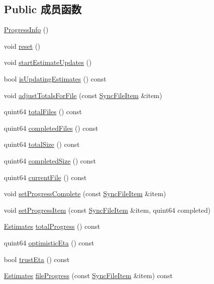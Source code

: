 \subsection*{Public 成员函数}
\begin{DoxyCompactItemize}
\item 
\hyperlink{class_o_c_c_1_1_progress_info_a3621453d1da2ab09c89d89608e95ba5b}{Progress\+Info} ()
\item 
void \hyperlink{class_o_c_c_1_1_progress_info_aeced3c151e007e246f8fd5b75d7e7e82}{reset} ()
\item 
void \hyperlink{class_o_c_c_1_1_progress_info_a07894c5202d9f21cb23ce308900c8415}{start\+Estimate\+Updates} ()
\item 
bool \hyperlink{class_o_c_c_1_1_progress_info_adcc9c47a252a15e9866059ea127c0b08}{is\+Updating\+Estimates} () const
\item 
void \hyperlink{class_o_c_c_1_1_progress_info_ae8e00e39cd1667ad01ff599502072b5d}{adjust\+Totals\+For\+File} (const \hyperlink{class_o_c_c_1_1_sync_file_item}{Sync\+File\+Item} \&item)
\item 
quint64 \hyperlink{class_o_c_c_1_1_progress_info_a031d811d62aa17facd575dc131276f61}{total\+Files} () const
\item 
quint64 \hyperlink{class_o_c_c_1_1_progress_info_a56f0f5ec6eeab19f5b0c0d5beb80b784}{completed\+Files} () const
\item 
quint64 \hyperlink{class_o_c_c_1_1_progress_info_a02066747326053ca6f65fd0d5da0e49a}{total\+Size} () const
\item 
quint64 \hyperlink{class_o_c_c_1_1_progress_info_a8344fb247413a34ee4a77b23d2c70303}{completed\+Size} () const
\item 
quint64 \hyperlink{class_o_c_c_1_1_progress_info_ae1738dcd4000ae2ea2c5def8e5859f56}{current\+File} () const
\item 
void \hyperlink{class_o_c_c_1_1_progress_info_a624d0dc2cd7c0d3a0b462ec895ea062c}{set\+Progress\+Complete} (const \hyperlink{class_o_c_c_1_1_sync_file_item}{Sync\+File\+Item} \&item)
\item 
void \hyperlink{class_o_c_c_1_1_progress_info_ad252ffcad193d4573c318674b1f51e97}{set\+Progress\+Item} (const \hyperlink{class_o_c_c_1_1_sync_file_item}{Sync\+File\+Item} \&item, quint64 completed)
\item 
\hyperlink{struct_o_c_c_1_1_progress_info_1_1_estimates}{Estimates} \hyperlink{class_o_c_c_1_1_progress_info_a9fc28f468039ee22600235f5f7420d58}{total\+Progress} () const
\item 
quint64 \hyperlink{class_o_c_c_1_1_progress_info_aeb96d14b9b572cce5bea986382cce5e7}{optimistic\+Eta} () const
\item 
bool \hyperlink{class_o_c_c_1_1_progress_info_a2c60b42f3236c168ef0e509ee8e09222}{trust\+Eta} () const
\item 
\hyperlink{struct_o_c_c_1_1_progress_info_1_1_estimates}{Estimates} \hyperlink{class_o_c_c_1_1_progress_info_a7a264725a370e2e2bf41fc283d5971c0}{file\+Progress} (const \hyperlink{class_o_c_c_1_1_sync_file_item}{Sync\+File\+Item} \&item) const
\end{DoxyCompactItemize}
